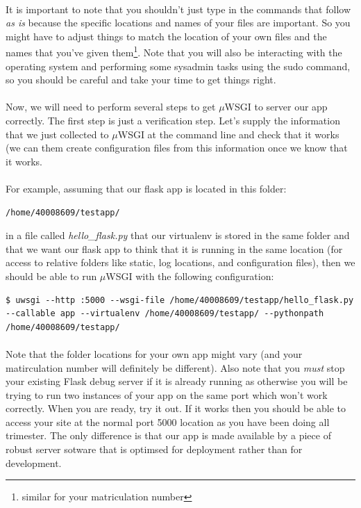 \documentclass[12pt, a4paper, oneside]{book}
\begin{document}
\paragraph{} It is important to note that you shouldn't just type in the commands that follow \emph{as is} because the specific locations and names of your files are important. So you might have to adjust things to match the location of your own files and the names that you've given them\footnote{similar for your matriculation number}. Note that you will also be interacting with the operating system and performing some sysadmin tasks using the sudo command, so you should be careful and take your time to get things right.

\paragraph{} Now, we will need to perform several steps to get $\mu$WSGI to server our app correctly. The first step is just a verification step. Let's supply the information that we just collected to $\mu$WSGI at the command line and check that it works (we can them create configuration files from this information once we know that it works.

\paragraph{} For example, assuming that our flask app is located in this folder: 
\begin{lstlisting}
/home/40008609/testapp/ 
\end{lstlisting}
in a file called \emph{hello\_flask.py}  that our virtualenv is stored in the same folder and that we want our flask app to think that it is running in the same location (for access to relative folders like static, log locations, and configuration files), then we should be able to run $\mu$WSGI with the following configuration:

\begin{lstlisting}[style=DOS]
    $ uwsgi --http :5000 --wsgi-file /home/40008609/testapp/hello_flask.py --callable app --virtualenv /home/40008609/testapp/ --pythonpath /home/40008609/testapp/
\end{lstlisting}

\paragraph{} Note that the folder locations for your own app might vary (and your matirculation number will definitely be different). Also note that you \emph{must} stop your existing Flask debug server if it is already running as otherwise you will be trying to run two instances of your app on the same port which won't work correctly. When you are ready, try it out. If it works then you should be able to access your site at the normal port 5000 location as you have been doing all trimester. The only difference is that our app is made available by a piece of robust server sotware that is optimsed for deployment rather than for development.
\end{document}
